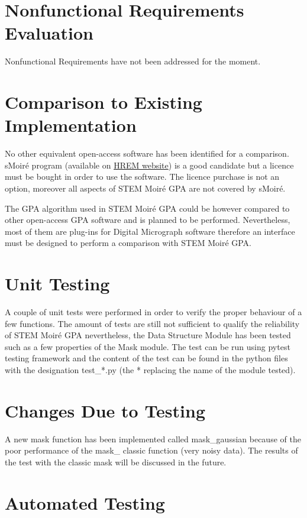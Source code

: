 \documentclass[12pt, titlepage]{article}
\newcommand{\progname}{STEM Moir{\'e} GPA}
\begin{document}
\section{Nonfunctional Requirements Evaluation}

Nonfunctional Requirements have not been addressed for the moment.
	
\section{Comparison to Existing Implementation}	

No other equivalent open-access software has been identified for a comparison. sMoir{\'e} program (available on \href{https://www.hremresearch.com/}{HREM website}) is a good candidate but a licence must be bought in order to use the software. The licence purchase is not an option, moreover all aspects of \progname{} are not covered by sMoir{\'e}.

The GPA algorithm used in \progname{} could be however compared to other open-access GPA software and is planned to be performed. Nevertheless, most of them are plug-ins for Digital Micrograph software therefore an interface must be designed to perform a comparison with \progname{}. 

\section{Unit Testing}

A couple of unit tests were performed in order to verify the proper behaviour of a few functions. The amount of tests are still not sufficient to qualify the reliability of \progname{} nevertheless, the Data Structure Module has been tested such as a few properties of the Mask module. The test can be run using pytest testing framework and the content of the test can be found in the python files with the designation test{\_}*.py (the * replacing the name of the module tested).

\section{Changes Due to Testing}

A new mask function has been implemented called mask{\_}gaussian because of the poor performance of the mask{\_} classic function (very noisy data). The results of the test with the classic mask will be discussed in the future.

\section{Automated Testing}
\end{document}
